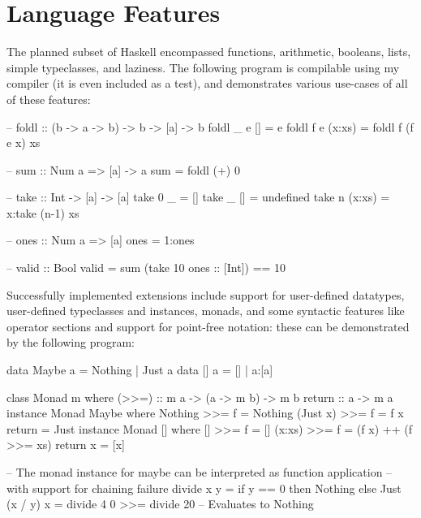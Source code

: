 \documentclass[dissertation.tex]{subfiles}
\begin{document}
\section{Language Features}
{

    The planned subset of Haskell encompassed functions, arithmetic, booleans, lists, simple typeclasses, and laziness.
    The following program is compilable using my compiler (it is even included as a test), and demonstrates various
    use-cases of all of these features:

    \begin{haskellfigure}
    -- foldl :: (b -> a -> b) -> b -> [a] -> b
    foldl _ e [] = e
    foldl f e (x:xs) = foldl f (f e x) xs

    -- sum :: Num a => [a] -> a
    sum = foldl (+) 0

    -- take :: Int -> [a] -> [a]
    take 0 _ = []
    take _ [] = undefined
    take n (x:xs) = x:take (n-1) xs

    -- ones :: Num a => [a]
    ones = 1:ones

    -- valid :: Bool
    valid = sum (take 10 ones :: [Int]) == 10
    \end{haskellfigure}


    Successfully implemented extensions include support for user-defined datatypes, user-defined typeclasses and
    instances, monads, and some syntactic features like operator sections and support for point-free notation: these can
    be demonstrated by the following program:

    \begin{haskellfigure}
    data Maybe a = Nothing | Just a
    data [] a = [] | a:[a]
    
    class Monad m where
        (>>=) :: m a -> (a -> m b) -> m b
        return :: a -> m a
    instance Monad Maybe where
        Nothing >>= f = Nothing
        (Just x) >>= f = f x
        return = Just
    instance Monad [] where
        [] >>= f = []
        (x:xs) >>= f = (f x) ++ (f >>= xs)
        return x = [x]

    -- The monad instance for maybe can be interpreted as function application
    -- with support for chaining failure
    divide x y = if y == 0 then Nothing else Just (x / y)
    x = divide 4 0 >>= divide 20 -- Evaluates to Nothing


\end{haskellfigure}}
\end{document}
